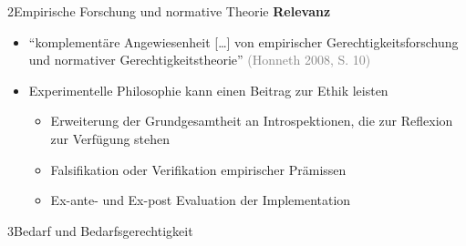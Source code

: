 \documentclass[xcolor=table,9pt,aspectratio=169]{beamer}
\begin{document}
\begin{frame}{\vspace*{10mm}2\hspace*{1em}Empirische Forschung und normative Theorie}
\textbf{Relevanz}\\
\medskip
\begin{itemize}
   \item \enquote{komplementäre Angewiesenheit [\ldots] von empirischer Gerechtigkeitsforschung und normativer Gerechtigkeitstheorie} \textcolor{gray}{(Honneth 2008, S. 10)}
   \item Experimentelle Philosophie kann einen Beitrag zur Ethik leisten
   \begin{itemize}
      \item Erweiterung der Grundgesamtheit an Introspektionen, die zur Reflexion zur Verfügung stehen
      \item Falsifikation oder Verifikation empirischer Pr\"amissen
      \item Ex-ante- und Ex-post Evaluation der Implementation
   \end{itemize}
\end{itemize}
\end{frame}


\begin{frame}
\begin{overlayarea}{\textwidth}{0.81\paperheight}{
   \vspace*{11mm}
   \textcolor{uolblue}
   {3\hspace*{1em}Bedarf und Bedarfsgerechtigkeit}
}
\end{overlayarea}
\end{frame}
\end{document}
